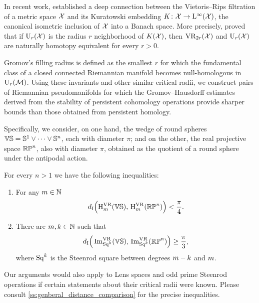 \medskip In recent work, \cite{lim2024vietoris} established a deep connection between the Vietoris--Rips filtration of a metric space \(\mathcal{X}\) and its Kuratowski embedding \(K \colon \mathcal{X} \to \mathrm{L}^\infty(\mathcal{X})\), the canonical isometric inclusion of \(\mathcal{X}\) into a Banach space.
More precisely, \cite{lim2024vietoris} proved that if \(\mathrm{U}_r(\mathcal{X})\) is the radius \(r\) neighborhood of \(K(\mathcal{X})\), then \(\mathrm{VR}_{2r}(\mathcal{X})\) and \(\mathrm{U}_r(\mathcal{X})\) are naturally homotopy equivalent for every \(r > 0\).

Gromov's filling radius is defined as the smallest \(r\) for which the fundamental class of a closed connected Riemannian manifold becomes null-homologous in \(\mathrm{U}_r(\mathcal{M})\).
Using these invariants and other similar critical radii, we construct pairs of Riemannian pseudomanifolds for which the Gromov--Hausdorff estimates derived from the stability of persistent cohomology operations provide sharper bounds than those obtained from persistent homology.



Specifically, we consider, on one hand, the wedge of round spheres \(\mathbb{VS} = \mathbb{S}^1 \vee \dots \vee \mathbb{S}^n\), each with diameter \(\pi\); and on the other, the real projective space \(\mathbb{RP}^n\), also with diameter \(\pi\), obtained as the quotient of a round sphere under the antipodal action.

\medskip\theorem
For every \(n > 1\) we have the following inequalities:
\begin{enumerate}
	\item For any \(m \in \mathbb{N}\)
	\[
	d_{\mathrm{I}}\Big(\mathrm{H}^{\mathrm{VR}}_m(\mathbb{VS}),\, \mathrm{H}^{\mathrm{VR}}_m(\mathbb{RP}^n)\Big) < \frac{\pi}{4}.
	\]

	\item There are \(m, k \in \mathbb{N}\) such that
	\[
	d_{\mathrm{I}}\Big(\operatorname{Im}_{\mathrm{Sq}^k}^{\mathrm{VR}}(\mathbb{VS}),\, \operatorname{Im}_{\mathrm{Sq}^k}^{\mathrm{VR}}(\mathbb{RP}^n)\Big) \geq \frac{\pi}{3},
	\]
	where \(\mathrm{Sq}^k\) is the Steenrod square between degrees \(m-k\) and \(m\).
\end{enumerate}

\medskip Our arguments would also apply to Lens spaces and odd prime Steenrod operations if certain statements about their critical radii were known.
Please consult \cref{ss:genberal_distance_comparison} for the precise inequalities.

